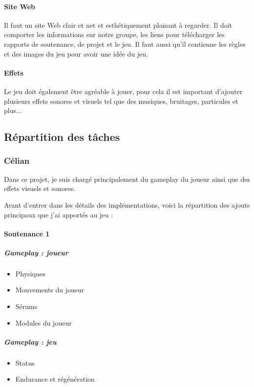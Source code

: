\documentclass{article}
\begin{document}
\paragraph{Site Web}
Il faut un site Web clair et net et esthétiquement plaisant à regarder. Il doit comporter les informations sur notre groupe, les liens pour télécharger les rapports de soutenance, de projet et le jeu. Il faut aussi qu'il contienne les règles et des images du jeu pour avoir une idée du jeu.

\paragraph{Effets}
Le jeu doit également être agréable à jouer, pour cela il est important d'ajouter plusieurs effets sonores et visuels tel que des musiques, bruitages, particules et plus...

\newpage
\subsection{Répartition des tâches}

\subsubsection{Célian}

Dans ce projet, je suis chargé principalement du gameplay du joueur ainsi que des effets visuels et sonores.

Avant d'entrer dans les détails des implémentations, voici la répartition des ajouts principaux que j'ai apportés au jeu :

\paragraph{Soutenance 1}

\subparagraph{Gameplay : joueur}

\begin{itemize}
    \item Physiques
    \item Mouvements du joueur
    \item Sérums
    \item Modules du joueur
\end{itemize}

\subparagraph{Gameplay : jeu}

\begin{itemize}
    \item Status
    \item Endurance et régénération
\end{itemize}
\end{document}
